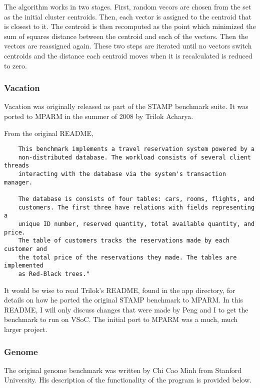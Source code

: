 \documentclass{article}
\begin{document}
The algorithm works in two stages. First, random vecors are chosen from the
set as the initial cluster centroids. Then, each vector is assigned to the 
centroid that is closest to it. The centroid is then recomputed as the point
which minimized the sum of squares distance between the centroid and each of 
the vectors. Then the vectors are reassigned again. These two steps are
iterated until no vectors switch centroids and the distance each centroid moves
when it is recalculated is reduced to zero. 

\subsubsection{Vacation}

Vacation was originally released as part of the STAMP benchmark suite. It was
ported to MPARM in the summer of 2008 by Trilok Acharya.

From the original README, 

\begin{verbatim}
    This benchmark implements a travel reservation system powered by a
    non-distributed database. The workload consists of several client threads
    interacting with the database via the system's transaction manager.

    The database is consists of four tables: cars, rooms, flights, and 
    customers. The first three have relations with fields representing a 
    unique ID number, reserved quantity, total available quantity, and price. 
    The table of customers tracks the reservations made by each customer and 
    the total price of the reservations they made. The tables are implemented 
    as Red-Black trees."
\end{verbatim}

It would be wise to read Trilok's README, found in the app directory, for 
details on how he ported the original STAMP benchmark to MPARM. In this README,
I will only discuss changes that were made by Peng and I to get the benchmark
to run on VSoC. The initial port to MPARM was a much, much larger project. 

\subsubsection{Genome}

The original genome benchmark was written by Chi Cao Minh from Stanford 
University. His description of the functionality of the program is provided 
below.
\end{document}
